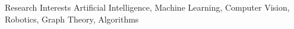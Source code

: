 \documentclass{resume}
\begin{document}

\begin{rSection}{Research Interests}
Artificial Intelligence, Machine Learning, Computer Vision, Robotics, Graph Theory, Algorithms
\end{rSection}
\end{document}
